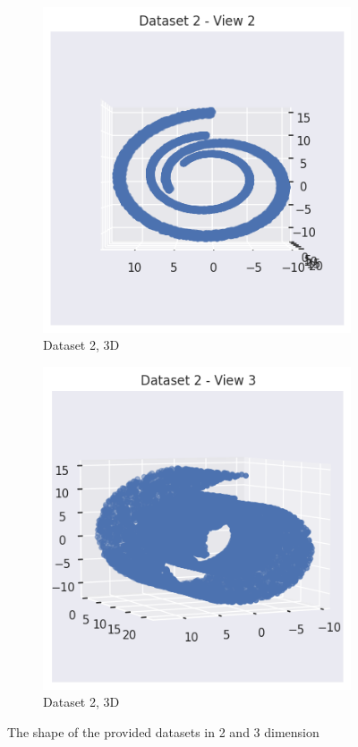 \documentclass[12pt]{article}
\begin{document}
\begin{figure}[ht]
\begin{subfigure}{0.3\textwidth}
      \includegraphics[width=\linewidth]{00.png}
      \caption{Dataset 2, 3D}
      \label{fig:provided_data_2}
    \end{subfigure}%
    \hfill
    \begin{subfigure}{0.3\textwidth}
      \centering
      \includegraphics[width=\linewidth]{000.png}
      \caption{Dataset 2, 3D}
      \label{fig:provided_data_3}
    \end{subfigure}
    \caption{The shape of the provided datasets in 2 and 3 dimension}
    \label{fig:provided_data}
\end{figure}
\end{document}
